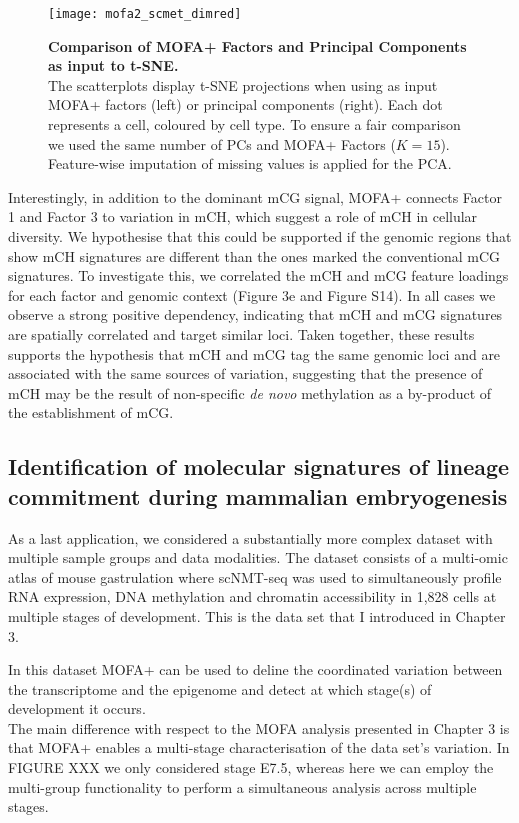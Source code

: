\begin{figure}[H]
	\centering
	\texttt{[image: mofa2\_scmet\_dimred]}
	\caption[]{
	\textbf{Comparison of MOFA+ Factors and Principal Components as input to t-SNE.}\\
	The scatterplots display t-SNE projections when using as input MOFA+ factors (left) or principal components (right). Each dot represents a cell, coloured by cell type\cite{Luo2016}. To ensure a fair comparison we used the same number of PCs and MOFA+ Factors ($K=15$). Feature-wise imputation of missing values is applied for the PCA.
	}
	\label{fig:mofa2_scmet_dimred}
\end{figure}



Interestingly, in addition to the dominant mCG signal, MOFA+ connects Factor 1 and Factor 3 to variation in mCH, which suggest a role of mCH in cellular diversity. We hypothesise that this could be supported if the genomic regions that show mCH signatures are different than the ones marked the conventional mCG signatures. To investigate this, we correlated the mCH and mCG feature loadings for each factor and genomic context (Figure 3e and Figure S14). In all cases we observe a strong positive dependency, indicating that mCH and mCG signatures are spatially correlated and target similar loci.
Taken together, these results supports the hypothesis that mCH and mCG tag the same genomic loci and are associated with the same sources of variation, suggesting that the presence of mCH may be the result of non-specific \textit{de novo} methylation as a by-product of the establishment of mCG.



\subsection{Identification of molecular signatures of lineage commitment during mammalian embryogenesis}

As a last application, we considered a substantially more complex dataset with multiple sample groups and data modalities. The dataset consists of a multi-omic atlas of mouse gastrulation where scNMT-seq was used to simultaneously profile RNA expression, DNA methylation and chromatin accessibility in 1,828 cells at multiple stages of development\cite{Argelaguet2019}. This is the data set that I introduced in Chapter 3.

In this dataset MOFA+ can be used to deline the coordinated variation between the transcriptome and the epigenome and detect at which stage(s) of development it occurs.\\
The main difference with respect to the MOFA analysis presented in Chapter 3 is that MOFA+ enables a multi-stage characterisation of the data set's variation. In FIGURE XXX we only considered stage E7.5, whereas here we can employ the multi-group functionality to perform a simultaneous analysis across multiple stages.

